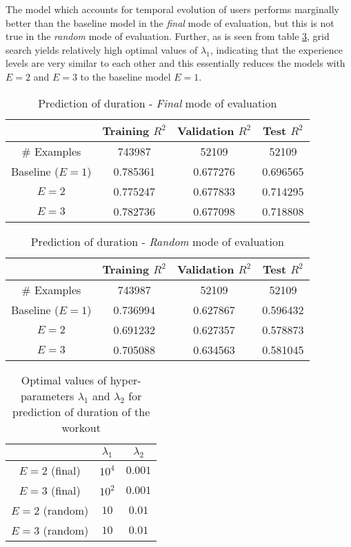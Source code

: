 \documentclass{acm_proc_article-sp}
\begin{document}
The model which accounts for temporal evolution of users performs marginally better than the baseline model in the \emph{final} mode of evaluation, but this is not true in the \emph{random} mode of evaluation. Further, as is seen from table \ref{tableDurationHyperparams}, grid search yields relatively high optimal values of $\lambda_1$, indicating that the experience levels are very similar to each other and this essentially reduces the models with $E = 2$ and $E = 3$ to the baseline model $E = 1$.

\begin{table}[h]
\centering
\begin{tabular}{|c|c|c|c|} \hline
& Training $R^2$ & Validation $R^2$ & Test $R^2$ \\ \hline
\# Examples & 743987 & 52109 & 52109 \\ \hline
Baseline ($E = 1$) & 0.785361 & 0.677276 & 0.696565 \\ \hline
$E = 2$ & 0.775247 & 0.677833 & 0.714295 \\ \hline
$E = 3$ & 0.782736 & 0.677098 & 0.718808 \\ \hline
\end{tabular}
\caption{Prediction of duration - \emph{Final} mode of evaluation }
\label{tableDurationFinal}
\end{table}

\begin{table}[h]
\centering
\begin{tabular}{|c|c|c|c|} \hline
& Training $R^2$ & Validation $R^2$ & Test $R^2$ \\ \hline
\# Examples & 743987 & 52109 & 52109  \\ \hline
Baseline ($E = 1$) & 0.736994 & 0.627867 & 0.596432 \\ \hline
$E = 2$ & 0.691232 & 0.627357 & 0.578873 \\ \hline
$E = 3$ & 0.705088 & 0.634563 & 0.581045 \\ \hline
\end{tabular}
\caption{Prediction of duration - \emph{Random} mode of evaluation }
\label{tableDurationRandom}
\end{table}

\begin{table}[h]
\centering
\begin{tabular}{|c|c|c|} \hline
& $\lambda_1$ & $\lambda_2$ \\ \hline
$E = 2$ (final) & $10^4$ & $0.001$ \\ \hline
$E = 3$ (final) & $10^2$ & $0.001$ \\ \hline
$E = 2$ (random) & $10$ & $0.01$ \\ \hline
$E = 3$ (random) & $10$ & $0.01$ \\ \hline
\end{tabular}
\caption{Optimal values of hyper-parameters $\lambda_1$ and $\lambda_2$ for prediction of duration of the workout}
\label{tableDurationHyperparams}
\end{table}
\end{document}
